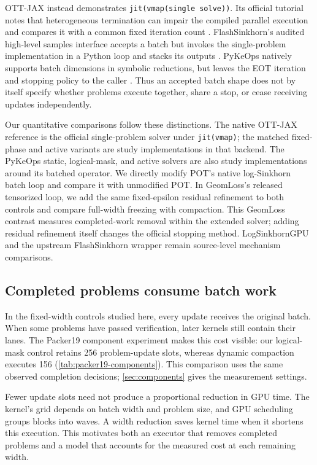 OTT-JAX instead demonstrates \texttt{jit(vmap(single solve))}. Its official tutorial notes that heterogeneous termination can impair the compiled parallel execution and compares it with a common fixed iteration count \citep{ott2026batching}. FlashSinkhorn's audited high-level samples interface accepts a batch but invokes the single-problem implementation in a Python loop and stacks its outputs \citep{flashsinkhorncode2026}. PyKeOps natively supports batch dimensions in symbolic reductions, but leaves the EOT iteration and stopping policy to the caller \citep{pykeops2026batch}. Thus an accepted batch shape does not by itself specify whether problems execute together, share a stop, or cease receiving updates independently.

Our quantitative comparisons follow these distinctions. The native OTT-JAX reference is the official single-problem solver under \texttt{jit(vmap)}; the matched fixed-phase and active variants are study implementations in that backend. The PyKeOps static, logical-mask, and active solvers are also study implementations around its batched operator. We directly modify POT's native log-Sinkhorn batch loop and compare it with unmodified POT. In GeomLoss's released tensorized loop, we add the same fixed-epsilon residual refinement to both controls and compare full-width freezing with compaction. This GeomLoss contrast measures completed-work removal within the extended solver; adding residual refinement itself changes the official stopping method. LogSinkhornGPU and the upstream FlashSinkhorn wrapper remain source-level mechanism comparisons.

\subsection{Completed problems consume batch work}

In the fixed-width controls studied here, every update receives the original batch. When some problems have passed verification, later kernels still contain their lanes. The Packer19 component experiment makes this cost visible: our logical-mask control retains 256 problem-update slots, whereas dynamic compaction executes 156 (\cref{tab:packer19-components}). This comparison uses the same observed completion decisions; \cref{sec:components} gives the measurement settings.


Fewer update slots need not produce a proportional reduction in GPU time. The kernel's grid depends on batch width and problem size, and GPU scheduling groups blocks into waves. A width reduction saves kernel time when it shortens this execution. This motivates both an executor that removes completed problems and a model that accounts for the measured cost at each remaining width.

